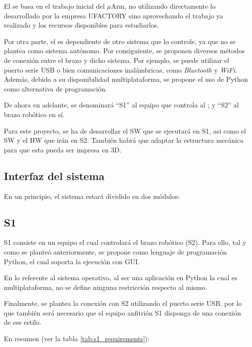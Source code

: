 El \pArm{} se basa en el trabajo inicial del $\mu$Arm, no utilizando directamente lo desarrollado por la empresa UFACTORY sino aprovechando el trabajo ya realizado y los recursos disponibles para estudiarlos. 

Por otra parte, el \pArm{} es dependiente de otro sistema que lo controle, ya que no se plantea como sistema autónomo. Por consiguiente, se proponen diversos métodos de conexión entre el brazo y dicho sistema. Por ejemplo, se puede utilizar el puerto serie \ac{USB} o bien comunicaciones inalámbricas, como \textit{Bluetooth} y \textit{WiFi}. Además, debido a su disponibilidad multiplataforma, se propone el uso de Python como alternativa de programación.

De ahora en adelante, se denominará ``\ac{S1}'' al equipo que controla al \pArm{}; y ``\ac{S2}'' al brazo robótico en sí.

Para este proyecto, se ha de desarrollar el \ac{SW} que se ejecutará en \ac{S1}, asi como el \ac{SW} y el \ac{HW} que irán en \ac{S2}.
También habrá que adaptar la estructura mecánica para que esta pueda ser impresa en 3D.

\subsection{Interfaz del sistema}
En un principio, el sistema estará dividido en dos módulos:

\subsection*{\ac{S1}}
\ac{S1} consiste en un equipo el cual controlará el brazo robótico (\ac{S2}). Para ello, tal y como se planteó anteriormente, se propone como lenguaje de programación Python, el cual soporta la ejecución con \ac{GUI}.

En lo referente al sistema operativo, al ser una aplicación en Python la cual es multiplataforma, no se define ninguna restricción respecto al mismo.

Finalmente, se plantea la conexión con \ac{S2} utilizando el puerto serie \ac{USB}, por lo que también será necesario que el equipo anfitrión \ac{S1} disponga de una conexión de ese estilo.

En resumen (ver la tabla \ref{tab:s1_requirements}):

